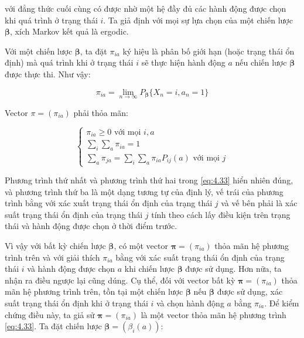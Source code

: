 \documentclass[14pt, a4paper]{article}
\numberwithin{equation}{section}
\numberwithin{figure}{section}
\theoremstyle{sltheorem}
\theoremstyle{soltheorem}
\numberwithin{dl}{section}
\numberwithin{md}{section}
\numberwithin{vd}{section}
\begin{document}
    với đẳng thức cuối cùng có được nhờ một hệ đầy đủ các hành động được chọn khi quá trình ở trạng thái $i$.
    Ta giả định với mọi sự lựa chọn của một chiến lược $\boldsymbol{\beta}$, xích Markov kết quả là ergodic.

    Với một chiến lược $\boldsymbol{\beta}$, ta đặt $\pi_{ia}$ ký hiệu là phân bố giới hạn (hoặc trạng thái ổn định) mà quá trình khi ở trạng thái $i$ sẽ thực hiện hành động $a$ nếu chiến lược $\boldsymbol{\beta}$ được thực thi.
    Như vậy:

    \begin{equation*}
        \pi_{ia} = \lim_{n \rightarrow \infty} P_{\boldsymbol{\beta}} \lbrace X_n = i, a_n = 1 \rbrace
    \end{equation*}

    Vector $\pi = (\pi_{ia})$ phải thỏa mãn:

    \begin{equation} \label{eq:4.33}
        \begin{cases}
            \pi_{ia} \geq 0 \text{ với mọi } i, a \\
            \sum_{i} \sum_{a} \pi_{ia} = 1 \\
            \sum_a \pi_{ja} = \sum_i \sum_a \pi_{ia} P_{ij} (a) \text{ với mọi } j
        \end{cases}
    \end{equation}

    Phương trình thứ nhất và phương trình thứ hai trong \ref{eq:4.33} hiển nhiên đúng, và phương trình thứ ba là một dạng tương tự của định lý, vế trái của phương trình bằng với xác xuất trạng thái ổn định của trạng thái $j$ và vế bên phải là xác suất trạng thái ổn định của trạng thái $j$ tính theo cách lấy điều kiện trên trạng thái và hành động được chọn ở thời điểm trước.

    Vì vậy với bất kỳ chiến lược $\boldsymbol{\beta}$, có một vector $\boldsymbol{\pi}=(\pi_{ia})$ thỏa mãn hệ phương trình trên và với giải thích $\pi_{ia}$ bằng với xác suất trạng thái ổn định của trạng thái $i$ và hành động được chọn $a$ khi chiến lược $\boldsymbol{\beta}$ được sử dụng.
    Hơn nữa, ta nhận ra điều ngược lại cũng dúng.
    Cụ thể, đối với vector bất kỳ $\boldsymbol{\pi}=(\pi_{ia})$ thỏa mãn hệ phương trình trên, tồn tại một chiến lược $\boldsymbol{\beta}$ nếu $\boldsymbol{\beta}$ được sử dụng, xác suất trạng thái ổn định khi ở trạng thái $i$ và chọn hành động $a$ bằng $\pi_{ia}$.
    Để kiểm chứng điều này, ta giả sử $\boldsymbol{\pi} = (\pi_{ia})$ là một vector thỏa mãn hệ phương trình \ref{eq:4.33}.
    Ta đặt chiến lược $\boldsymbol{\beta}=(\beta_i(a))$:
\end{document}
